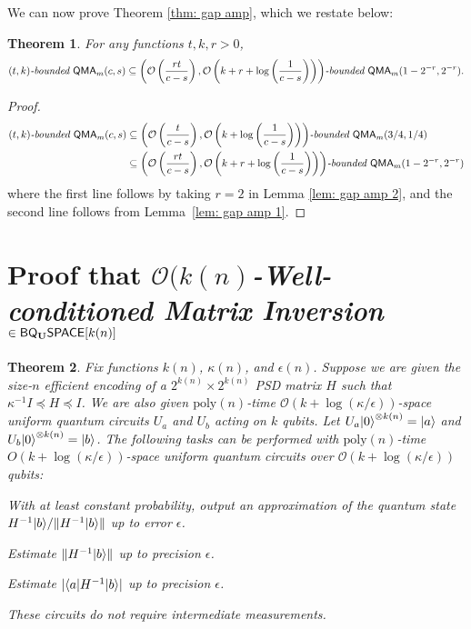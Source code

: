 \documentclass[11pt]{article}
\newtheorem{theorem}{Theorem}
\theoremstyle{definition}
\theoremstyle{remark}
\newcommand\QMA{{\sf{QMA}}}
\newcommand\bddQMA[5]{{\left(#1,#2\right)}\textit{-bounded }\QMA_{#3}(#4,#5)}
\newcommand\matrixinvert[1]{{\ensuremath{#1}}\textit{-Well-conditioned Matrix Inversion}}
\newcommand{\classfont}{\sf}
\newcommand{\Unitary}{\mathbf{U}}
\newcommand{\unitaryBQSPACE}[1]{{\classfont{BQ}_\Unitary\classfont{SPACE}}[#1]}
\newcommand\bigoh{\mathcal{O}}
\newcommand{\poly}{\textrm{poly}}
\begin{document}
We can now prove Theorem \ref{thm: gap amp}, which we restate below:
\begingroup
\def\thetheorem{\ref{thm: gap amp}}
\begin{theorem}
For any functions $t,k,r>0$, 
\[
\bddQMA{t}{k}{m}{c}{s}\subseteq\bddQMA{\mathcal{O}\left(\frac{rt}{c-s}\right)}{\mathcal{O}\left(k+r+\log\left(\frac{1}{c-s}\right)\right)}{m}{1-2^{-r}}{2^{-r}}.
\]
\end{theorem}
\addtocounter{theorem}{-1}
\endgroup

\begin{proof}
\begin{align}
\bddQMA{t}{k}{m}{c}{s} &\subseteq \bddQMA{\mathcal{O}\left(\frac{t}{c-s}\right)}{\mathcal{O}\left(k+\log\left(\frac{1}{c-s}\right)\right)}{m}{3/4}{1/4}  \nonumber \\
&\subseteq \bddQMA{\mathcal{O}\left(\frac{rt}{c-s}\right)}{\mathcal{O}\left(k+r+\log\left(\frac{1}{c-s}\right)\right)}{m}{1-2^{-r}}{2^{-r}} \nonumber
\end{align}
where the first line follows by taking $r=2$ in Lemma \ref{lem: gap amp 2}, and the second line follows from Lemma~\ref{lem: gap amp 1}.
\end{proof}

\section{Proof that \matrixinvert{\bigoh(k(n)} $\in \unitaryBQSPACE{k(n)}$}\label{app: matrix inversion alg}

\begingroup
\def\thetheorem{\ref{thm: matrix inversion alg}}
\begin{theorem}
Fix functions $k(n)$, $\kappa(n)$, and $\epsilon(n)$. Suppose we are given the size-$n$ efficient encoding of a $2^{k(n)} \times 2^{k(n)}$ PSD matrix $H$ such that $\kappa^{-1} I \preceq H \preceq I$. We are also given $\poly(n)$-time $\mathcal{O}(k+\log(\kappa/\epsilon))$-space uniform quantum circuits $U_a$ and $U_b$ acting on $k$ qubits. Let $U_a{\left\vert{0}\right\rangle}^{\otimes k(n)} = {\left\vert{a}\right\rangle}$ and $U_b{\left\vert{0}\right\rangle}^{\otimes k(n)} = {\left\vert{b}\right\rangle}$. The following tasks can be performed with $\poly(n)$-time $O(k+\log(\kappa/\epsilon))$-space uniform quantum circuits over $\bigoh (k+\log(\kappa/\epsilon))$ qubits:
\begin{compactenum}
\item With at least constant probability, output an approximation of the quantum state $H^{-1}{\left\vert{b}\right\rangle} / \|H^{-1}{\left\vert{b}\right\rangle}\|$ up to error $\epsilon$.
\item Estimate $\|H^{-1}{\left\vert{b}\right\rangle}\|$ up to precision $\epsilon$.
\item Estimate  $|{\left\langle{a}\right\vert}H^{-1}{\left\vert{b}\right\rangle}|$ up to precision $\epsilon$.
\end{compactenum}
These circuits do not require intermediate measurements.
\end{theorem}
\addtocounter{theorem}{-1}
\endgroup
\end{document}

